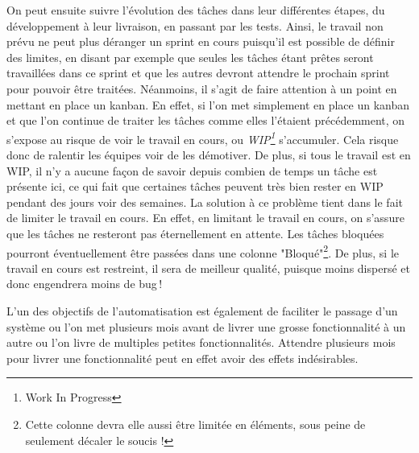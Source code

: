 On peut ensuite suivre l'évolution des tâches dans leur différentes étapes, du développement à leur livraison, en passant par les tests. Ainsi, le travail non prévu ne peut plus déranger un sprint en cours puisqu'il est possible de définir des limites, en disant par exemple que seules les tâches étant prêtes seront travaillées dans ce sprint et que les autres devront attendre le prochain sprint pour pouvoir être traitées. Néanmoins, il s'agit de faire attention à un point en mettant en place un kanban. En effet, si l'on met simplement en place un kanban et que l'on continue de traiter les tâches comme elles l'étaient précédemment, on s'expose au risque de voir le travail en cours, ou \emph{WIP\footnote{Work In Progress}} s'accumuler. Cela risque donc de ralentir les équipes voir de les démotiver. De plus, si tous le travail est en WIP, il n'y a aucune façon de savoir depuis combien de temps un tâche est présente ici, ce qui fait que certaines tâches peuvent très bien rester en WIP pendant des jours voir des semaines. La solution à ce problème tient dans le fait de limiter le travail en cours. En effet, en limitant le travail en cours, on s'assure que les tâches ne resteront pas éternellement en attente. Les tâches bloquées pourront éventuellement être passées dans une colonne "Bloqué"\footnote{Cette colonne devra elle aussi être limitée en éléments, sous peine de seulement décaler le soucis !}. De plus, si le travail en cours est restreint, il sera de meilleur qualité, puisque moins dispersé et donc engendrera moins de bug !

L'un des objectifs de l'automatisation est également de faciliter le passage d'un système ou l'on met plusieurs mois avant de livrer une grosse fonctionnalité à un autre ou l'on livre de multiples petites fonctionnalités. Attendre plusieurs mois pour livrer une fonctionnalité peut en effet avoir des effets indésirables.

